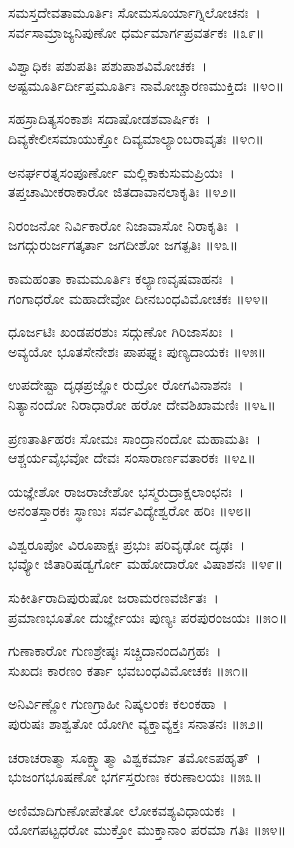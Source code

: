 	ಸಮಸ್ತದೇವತಾಮೂರ್ತಿಃ ಸೋಮಸೂರ್ಯಾಗ್ನಿಲೋಚನಃ~।\\
	ಸರ್ವಸಾಮ್ರಾಜ್ಯನಿಪುಣೋ ಧರ್ಮಮಾರ್ಗಪ್ರವರ್ತಕಃ ॥೩೯॥

ವಿಶ್ವಾಧಿಕಃ ಪಶುಪತಿಃ ಪಶುಪಾಶವಿಮೋಚಕಃ~।\\
ಅಷ್ಟಮೂರ್ತಿರ್ದೀಪ್ತಮೂರ್ತಿಃ ನಾಮೋಚ್ಚಾರಣಮುಕ್ತಿದಃ ॥೪೦॥

	ಸಹಸ್ರಾದಿತ್ಯಸಂಕಾಶಃ ಸದಾಷೋಡಶವಾರ್ಷಿಕಃ~।\\
	ದಿವ್ಯಕೇಲೀಸಮಾಯುಕ್ತೋ ದಿವ್ಯಮಾಲ್ಯಾಂಬರಾವೃತಃ ॥೪೧॥

ಅನರ್ಘರತ್ನಸಂಪೂರ್ಣೋ ಮಲ್ಲಿಕಾಕುಸುಮಪ್ರಿಯಃ~।\\
ತಪ್ತಚಾಮೀಕರಾಕಾರೋ ಜಿತದಾವಾನಲಾಕೃತಿಃ ॥೪೨॥

	ನಿರಂಜನೋ ನಿರ್ವಿಕಾರೋ ನಿಜಾವಾಸೋ ನಿರಾಕೃತಿಃ~।\\
	ಜಗದ್ಗುರುರ್ಜಗತ್ಕರ್ತಾ ಜಗದೀಶೋ ಜಗತ್ಪತಿಃ ॥೪೩॥

ಕಾಮಹಂತಾ ಕಾಮಮೂರ್ತಿಃ ಕಲ್ಯಾಣವೃಷವಾಹನಃ~।\\
ಗಂಗಾಧರೋ ಮಹಾದೇವೋ ದೀನಬಂಧವಿಮೋಚಕಃ ॥೪೪॥

	ಧೂರ್ಜಟಿಃ ಖಂಡಪರಶುಃ ಸದ್ಗುಣೋ ಗಿರಿಜಾಸಖಃ~।\\
	ಅವ್ಯಯೋ ಭೂತಸೇನೇಶಃ ಪಾಪಘ್ನಃ ಪುಣ್ಯದಾಯಕಃ ॥೪೫॥

ಉಪದೇಷ್ಟಾ ದೃಢಪ್ರಜ್ಞೋ ರುದ್ರೋ ರೋಗವಿನಾಶನಃ~।\\
ನಿತ್ಯಾನಂದೋ ನಿರಾಧಾರೋ ಹರೋ ದೇವಶಿಖಾಮಣಿಃ ॥೪೬॥

	ಪ್ರಣತಾರ್ತಿಹರಃ ಸೋಮಃ ಸಾಂದ್ರಾನಂದೋ ಮಹಾಮತಿಃ~।\\
	ಆಶ್ಚರ್ಯವೈಭವೋ ದೇವಃ ಸಂಸಾರಾರ್ಣವತಾರಕಃ ॥೪೭॥

ಯಜ್ಞೇಶೋ ರಾಜರಾಜೇಶೋ ಭಸ್ಮರುದ್ರಾಕ್ಷಲಾಂಛನಃ~।\\
ಅನಂತಸ್ತಾರಕಃ ಸ್ಥಾಣುಃ ಸರ್ವವಿದ್ಯೇಶ್ವರೋ ಹರಿಃ ॥೪೮॥

	ವಿಶ್ವರೂಪೋ ವಿರೂಪಾಕ್ಷಃ ಪ್ರಭುಃ ಪರಿವೃಢೋ ದೃಢಃ~।\\
	ಭವ್ಯೋ ಜಿತಾರಿಷಡ್ವರ್ಗೋ ಮಹೋದಾರೋ ವಿಷಾಶನಃ ॥೪೯॥

ಸುಕೀರ್ತಿರಾದಿಪುರುಷೋ ಜರಾಮರಣವರ್ಜಿತಃ~।\\
ಪ್ರಮಾಣಭೂತೋ ದುರ್ಜ್ಞೇಯಃ ಪುಣ್ಯಃ ಪರಪುರಂಜಯಃ ॥೫೦॥

	ಗುಣಾಕಾರೋ ಗುಣಶ್ರೇಷ್ಠಃ ಸಚ್ಚಿದಾನಂದವಿಗ್ರಹಃ~।\\
	ಸುಖದಃ ಕಾರಣಂ ಕರ್ತಾ ಭವಬಂಧವಿಮೋಚಕಃ ॥೫೧॥

ಅನಿರ್ವಿಣ್ಣೋ ಗುಣಗ್ರಾಹೀ ನಿಷ್ಕಲಂಕಃ ಕಲಂಕಹಾ~।\\
ಪುರುಷಃ ಶಾಶ್ವತೋ ಯೋಗೀ ವ್ಯಕ್ತಾವ್ಯಕ್ತಃ ಸನಾತನಃ ॥೫೨॥

	ಚರಾಚರಾತ್ಮಾ ಸೂಕ್ಷ್ಮಾತ್ಮಾ ವಿಶ್ವಕರ್ಮಾ ತಮೋಽಪಹೃತ್~।\\
	ಭುಜಂಗಭೂಷಣೋ ಭರ್ಗಸ್ತರುಣಃ ಕರುಣಾಲಯಃ ॥೫೩॥

ಅಣಿಮಾದಿಗುಣೋಪೇತೋ ಲೋಕವಶ್ಯವಿಧಾಯಕಃ~।\\
ಯೋಗಪಟ್ಟಧರೋ ಮುಕ್ತೋ ಮುಕ್ತಾನಾಂ ಪರಮಾ ಗತಿಃ ॥೫೪॥

